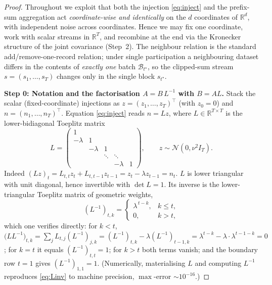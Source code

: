 \begin{proof}
Throughout we exploit that both the injection \eqref{eq:inject} and the prefix-sum aggregation act
\emph{coordinate-wise and identically} on the $d$ coordinates of $\mathbb R^d$, with independent noise
across coordinates. Hence we may fix one coordinate, work with scalar streams in $\mathbb R^{T}$, and
recombine at the end via the Kronecker structure of the joint covariance (Step~2). The neighbour
relation is the standard add/remove-one-record relation; under single participation a neighbouring
dataset differs in the contents of \emph{exactly one} batch $\mathcal B_{t^\star}$, so the clipped-sum
stream $s=(s_1,\dots,s_T)$ changes only in the single block $s_{t^\star}$.

\medskip
\noindent\textbf{Step 0: Notation and the factorisation $A=B\,L^{-1}$ with $B=AL$.}
Stack the scalar (fixed-coordinate) injections as $z=(z_1,\dots,z_T)^\top$ (with $z_0=0$) and
$n=(n_1,\dots,n_T)^\top$. Equation \eqref{eq:inject} reads $n=Lz$, where $L\in\mathbb R^{T\times T}$ is
the lower-bidiagonal Toeplitz matrix
\[
L=\begin{pmatrix}
1 & & & \\
-\lambda & 1 & & \\
 & -\lambda & 1 & \\
 & & \ddots & \ddots \\
 & & & -\lambda & 1
\end{pmatrix},
\qquad
z\sim\mathcal N(0,\nu^2 I_T).
\]
Indeed $(Lz)_t=L_{t,t}z_t+L_{t,t-1}z_{t-1}=z_t-\lambda z_{t-1}=n_t$. $L$ is lower triangular with
unit diagonal, hence invertible with $\det L=1$. Its inverse is the lower-triangular Toeplitz matrix
of geometric weights,
\begin{equation}
(L^{-1})_{t,k}=\begin{cases}\lambda^{\,t-k}, & k\le t,\\ 0,&k>t,\end{cases}
\label{eq:Linv}
\end{equation}
which one verifies directly: for $k<t$,
$\big(L L^{-1}\big)_{t,k}=\sum_j L_{t,j}(L^{-1})_{j,k}
=(L^{-1})_{t,k}-\lambda (L^{-1})_{t-1,k}=\lambda^{t-k}-\lambda\cdot\lambda^{t-1-k}=0$;
for $k=t$ it equals $(L^{-1})_{t,t}=1$; for $k>t$ both terms vanish; and the boundary row $t=1$ gives
$(L^{-1})_{1,1}=1$. (Numerically, materialising $L$ and computing $L^{-1}$ reproduces \eqref{eq:Linv}
to machine precision, $\max$-error $\sim10^{-16}$.)


\end{proof}
